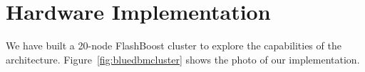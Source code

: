 \section{Hardware Implementation}
\label{sec:implementation}

We have built a 20-node FlashBoost cluster to explore the capabilities of the
architecture. Figure~\ref{fig:bluedbmcluster} shows the photo of our
implementation.


